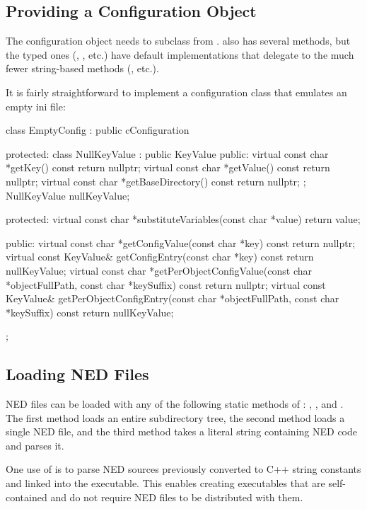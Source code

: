 \subsection{Providing a Configuration Object}
\label{sec:embedding:providing-a-configuration-object}

The configuration object needs to subclass from .
 also has several methods, but the typed ones
(, , etc.) have default implementations
that delegate to the much fewer string-based methods (, etc.).

It is fairly straightforward to implement a configuration class that
emulates an empty ini file:

\begin{cpp}
class EmptyConfig : public cConfiguration
{
  protected:
    class NullKeyValue : public KeyValue {
      public:
        virtual const char *getKey() const {return nullptr;}
        virtual const char *getValue() const {return nullptr;}
        virtual const char *getBaseDirectory() const {return nullptr;}
    };
    NullKeyValue nullKeyValue;

  protected:
    virtual const char *substituteVariables(const char *value) {return value;}

  public:
    virtual const char *getConfigValue(const char *key) const
        {return nullptr;}
    virtual const KeyValue& getConfigEntry(const char *key) const
        {return nullKeyValue;}
    virtual const char *getPerObjectConfigValue(const char *objectFullPath,
        const char *keySuffix) const {return nullptr;}
    virtual const KeyValue& getPerObjectConfigEntry(const char *objectFullPath,
        const char *keySuffix) const {return nullKeyValue;}
};
\end{cpp}


\subsection{Loading NED Files}
\label{sec:embedding:loading-ned-files}

NED files can be loaded with any of the following static methods of
: , ,
and . The first method loads an entire subdirectory tree,
the second method loads a single NED file, and the third method takes a literal
string containing NED code and parses it.

\begin{note}
One use of  is to parse NED sources previously converted
to C++ string constants and linked into the executable. This enables
creating executables that are self-contained and do not require NED files
to be distributed with them.
\end{note}

